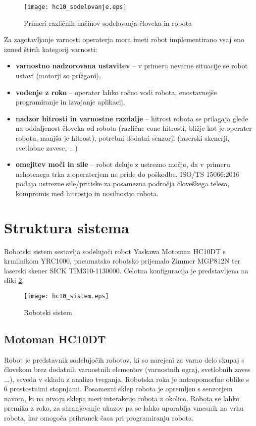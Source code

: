 \begin{figure}[!hbt]
	\centering
	\texttt{[image: hc10\_sodelovanje.eps]}
	\caption{Primeri različnih načinov sodelovanja človeka in robota}
	\label{fig:hc10_sodel}
\end{figure}


Za zagotavljanje varnosti operaterja mora imeti robot implementirano vsaj eno izmed štirih kategorij varnosti:
\begin{itemize}
	\item \textbf{varnostno nadzorovana ustavitev} -- v primeru nevarne situacije se robot ustavi (motorji so prižgani),
	\item \textbf{vodenje z roko}  -- operater lahko ročno vodi robota, enostavnejše programiranje in izvajanje aplikacij,
	\item \textbf{nadzor hitrosti in varnostne razdalje} -- hitrost robota se prilagaja glede na oddaljenost človeka od robota (različne cone hitrosti, bližje kot je operater robotu, manjša je hitrost), potrebni dodatni senzorji (laserski skenerji, svetlobne zavese, ...)
	\item \textbf{omejitev moči in sile} -- robot deluje z ustrezno močjo, da v primeru nehotenega trka z operaterjem ne pride do poškodbe, ISO/TS 15066:2016 podaja ustrezne sile/pritiske za posamezna področja človeškega telesa, kompromis med hitrostjo in nosilnostjo robota.
\end{itemize}


\section{Struktura sistema}
Robotski sistem sestavlja sodelujoči robot Yaskawa Motoman HC10DT s krmilnikom YRC1000, pneumatsko robotsko prijemalo Zimmer MGP812N ter laserski skener SICK TIM310-1130000. Celotna konfiguracija je predstavljena na sliki \ref{fig:hc10_sistem}.

\begin{figure}[!hbt]
	\centering
	\texttt{[image: hc10\_sistem.eps]}
	\caption{Robotski sistem}
	\label{fig:hc10_sistem}
\end{figure}

\subsection{Motoman HC10DT}

Robot je predstavnik sodelujočih robotov, ki so narejeni za varno delo skupaj s človekom brez dodatnih varnostnih elementov (varnostnih ograj, svetlobnih zaves ...), seveda v skladu z analizo tveganja. Robotska roka je antropomorfne oblike s 6 prostostnimi stopnjami. Posamezni sklep robota je opremljen s senzorjem navora, ki na nivoju sklepa meri interakcijo robota z okolico. Robota se lahko premika z roko, za shranjevanje ukazov pa se lahko uporablja vmesnik na vrhu robota, kar omogoča prihranek časa pri programiranju robota.

